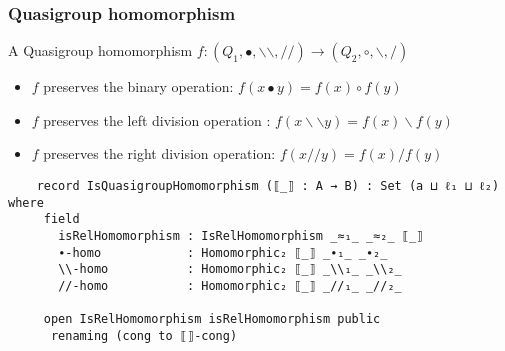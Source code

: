 \documentclass[xcolor={dvipsnames}]{beamer}
\begin{document}
\begin{frame}[fragile]
  \frametitle{Quasigroup homomorphism}
    A Quasigroup homomorphism \( f:(Q_1,∙,\backslash \backslash,//) \rightarrow
    (Q_2,\circ,\backslash,/) \)
    \begin{itemize}
        \item $f$ preserves the binary operation: $f(x∙y) = f(x) \circ f(y)$
        \item $f$ preserves the left division operation : $f(x\backslash \backslash y) = f(x)\backslash f(y)$
        \item $f$ preserves the right division operation: $f(x//y) = f(x)/f(y)$
    \end{itemize}
\begin{verbatim}
    record IsQuasigroupHomomorphism (⟦_⟧ : A → B) : Set (a ⊔ ℓ₁ ⊔ ℓ₂) where
     field
       isRelHomomorphism : IsRelHomomorphism _≈₁_ _≈₂_ ⟦_⟧
       ∙-homo            : Homomorphic₂ ⟦_⟧ _∙₁_ _∙₂_
       \\-homo           : Homomorphic₂ ⟦_⟧ _\\₁_ _\\₂_
       //-homo           : Homomorphic₂ ⟦_⟧ _//₁_ _//₂_
  
     open IsRelHomomorphism isRelHomomorphism public
      renaming (cong to ⟦⟧-cong)
\end{verbatim}
\end{frame}
  
\end{document}
